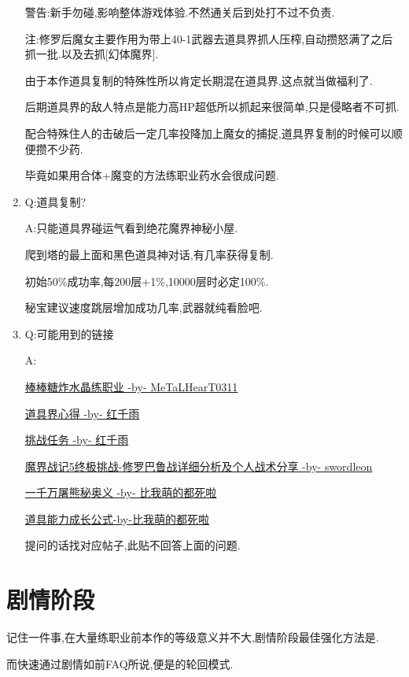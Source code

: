 \begin{enumerate}
	警告:新手勿碰,影响整体游戏体验.不然通关后到处打不过不负责.

	注:修罗后魔女主要作用为带上40-1武器去道具界抓人压榨,自动攒怒满了之后抓一批.以及去抓[幻体魔界].

	由于本作道具复制的特殊性所以肯定长期混在道具界,这点就当做福利了.

	后期道具界的敌人特点是能力高HP超低所以抓起来很简单,只是侵略者不可抓.

	配合特殊住人的击破后一定几率投降加上魔女的捕捉,道具界复制的时候可以顺便攒不少药.

	毕竟如果用合体+魔变的方法练职业药水会很成问题.


	\item
	Q:道具复制?

	A:只能道具界碰运气看到绝花魔界神秘小屋.

	爬到塔的最上面和黑色道具神对话,有几率获得复制.

	初始50\%成功率,每200层+1\%,10000层时必定100\%.

	秘宝建议速度跳层增加成功几率,武器就纯看脸吧.

	\item
	Q:可能用到的链接

	A:

	\href{http://tieba.baidu.com/p/3717431968}{棒棒糖炸水晶练职业 -by- MeTaLHearT0311}

	\href{http://tieba.baidu.com/p/3730196003}{道具界心得 -by- 红千雨}

	\href{http://tieba.baidu.com/p/3723862919}{挑战任务 -by- 红千雨}

	\href{http://tieba.baidu.com/p/3949061316}{魔界战记5终极挑战-修罗巴鲁战详细分析及个人战术分享 -by- swordleon}

	\href{http://tieba.baidu.com/p/3825275063}{一千万屠熊秘奥义 -by- 比我萌的都死啦}

	\href{http://tieba.baidu.com/f?kz=3834692385}{道具能力成长公式-by-比我萌的都死啦}

	提问的话找对应帖子,此贴不回答上面的问题.

\end{enumerate}


\newpage

\section{剧情阶段}

记住一件事,在大量练职业前本作的等级意义并不大,剧情阶段最佳强化方法是{\color{red}{捕获+榨取+嗑药}}.

而快速通过剧情如前FAQ所说,便是{\color{red}{魔女+buff+(一触即发)+奥义捕捉+压榨+嗑药}}的轮回模式.


